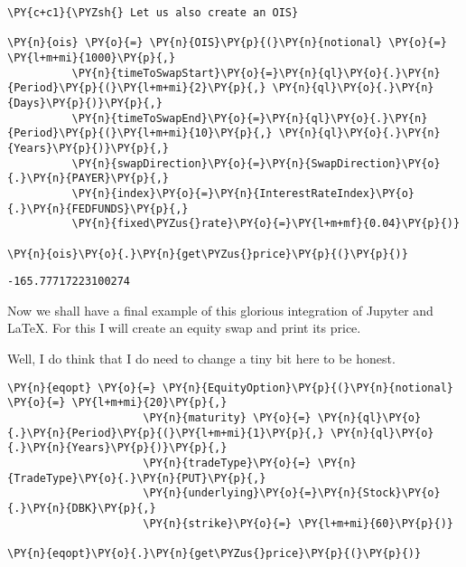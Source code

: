     \begin{tcolorbox}[breakable, size=fbox, boxrule=1pt, pad at break*=1mm,colback=cellbackground, colframe=cellborder]
\begin{Verbatim}[commandchars=\\\{\}]
\PY{c+c1}{\PYZsh{} Let us also create an OIS}

\PY{n}{ois} \PY{o}{=} \PY{n}{OIS}\PY{p}{(}\PY{n}{notional} \PY{o}{=} \PY{l+m+mi}{1000}\PY{p}{,}
          \PY{n}{timeToSwapStart}\PY{o}{=}\PY{n}{ql}\PY{o}{.}\PY{n}{Period}\PY{p}{(}\PY{l+m+mi}{2}\PY{p}{,} \PY{n}{ql}\PY{o}{.}\PY{n}{Days}\PY{p}{)}\PY{p}{,}
          \PY{n}{timeToSwapEnd}\PY{o}{=}\PY{n}{ql}\PY{o}{.}\PY{n}{Period}\PY{p}{(}\PY{l+m+mi}{10}\PY{p}{,} \PY{n}{ql}\PY{o}{.}\PY{n}{Years}\PY{p}{)}\PY{p}{,}
          \PY{n}{swapDirection}\PY{o}{=}\PY{n}{SwapDirection}\PY{o}{.}\PY{n}{PAYER}\PY{p}{,}
          \PY{n}{index}\PY{o}{=}\PY{n}{InterestRateIndex}\PY{o}{.}\PY{n}{FEDFUNDS}\PY{p}{,}
          \PY{n}{fixed\PYZus{}rate}\PY{o}{=}\PY{l+m+mf}{0.04}\PY{p}{)}

\PY{n}{ois}\PY{o}{.}\PY{n}{get\PYZus{}price}\PY{p}{(}\PY{p}{)}
\end{Verbatim}
\end{tcolorbox}

            \begin{tcolorbox}[breakable, size=fbox, boxrule=.5pt, pad at break*=1mm, opacityfill=0]
\begin{Verbatim}[commandchars=\\\{\}]
-165.77717223100274
\end{Verbatim}
\end{tcolorbox}
        
    Now we shall have a final example of this glorious integration of
Jupyter and LaTeX. For this I will create an equity swap and print its
price.

Well, I do think that I do need to change a tiny bit here to be honest.

    \begin{tcolorbox}[breakable, size=fbox, boxrule=1pt, pad at break*=1mm,colback=cellbackground, colframe=cellborder]
\begin{Verbatim}[commandchars=\\\{\}]
\PY{n}{eqopt} \PY{o}{=} \PY{n}{EquityOption}\PY{p}{(}\PY{n}{notional} \PY{o}{=} \PY{l+m+mi}{20}\PY{p}{,}
                     \PY{n}{maturity} \PY{o}{=} \PY{n}{ql}\PY{o}{.}\PY{n}{Period}\PY{p}{(}\PY{l+m+mi}{1}\PY{p}{,} \PY{n}{ql}\PY{o}{.}\PY{n}{Years}\PY{p}{)}\PY{p}{,}
                     \PY{n}{tradeType}\PY{o}{=} \PY{n}{TradeType}\PY{o}{.}\PY{n}{PUT}\PY{p}{,}
                     \PY{n}{underlying}\PY{o}{=}\PY{n}{Stock}\PY{o}{.}\PY{n}{DBK}\PY{p}{,}
                     \PY{n}{strike}\PY{o}{=} \PY{l+m+mi}{60}\PY{p}{)}

\PY{n}{eqopt}\PY{o}{.}\PY{n}{get\PYZus{}price}\PY{p}{(}\PY{p}{)}
\end{Verbatim}
\end{tcolorbox}


